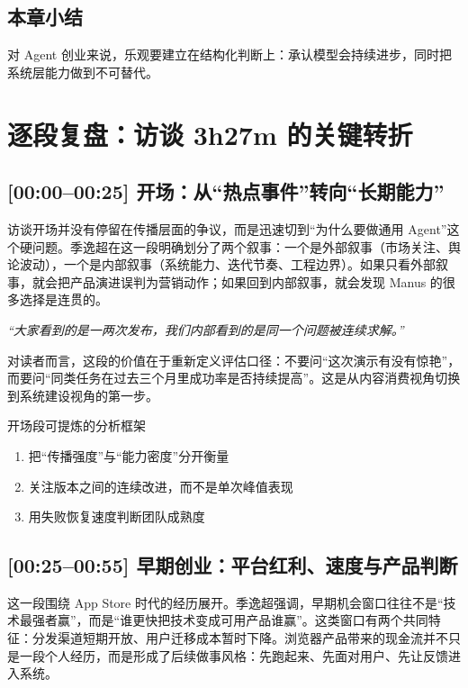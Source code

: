 \documentclass[a4paper]{article}
\begin{document}
\subsection{本章小结}

对 Agent 创业来说，乐观要建立在结构化判断上：承认模型会持续进步，同时把系统层能力做到不可替代。


\section{逐段复盘：访谈 3h27m 的关键转折}

\subsection{[00:00--00:25] 开场：从“热点事件”转向“长期能力”}

访谈开场并没有停留在传播层面的争议，而是迅速切到“为什么要做通用 Agent”这个硬问题。季逸超在这一段明确划分了两个叙事：一个是外部叙事（市场关注、舆论波动），一个是内部叙事（系统能力、迭代节奏、工程边界）。如果只看外部叙事，就会把产品演进误判为营销动作；如果回到内部叙事，就会发现 Manus 的很多选择是连贯的。

\textit{``大家看到的是一两次发布，我们内部看到的是同一个问题被连续求解。''}

对读者而言，这段的价值在于重新定义评估口径：不要问“这次演示有没有惊艳”，而要问“同类任务在过去三个月里成功率是否持续提高”。这是从内容消费视角切换到系统建设视角的第一步。

\begin{knowledgebox}{开场段可提炼的分析框架}
\begin{enumerate}
    \item 把“传播强度”与“能力密度”分开衡量
    \item 关注版本之间的连续改进，而不是单次峰值表现
    \item 用失败恢复速度判断团队成熟度
\end{enumerate}
\end{knowledgebox}

\subsection{[00:25--00:55] 早期创业：平台红利、速度与产品判断}

这一段围绕 App Store 时代的经历展开。季逸超强调，早期机会窗口往往不是“技术最强者赢”，而是“谁更快把技术变成可用产品谁赢”。这类窗口有两个共同特征：分发渠道短期开放、用户迁移成本暂时下降。浏览器产品带来的现金流并不只是一段个人经历，而是形成了后续做事风格：先跑起来、先面对用户、先让反馈进入系统。
\end{document}
